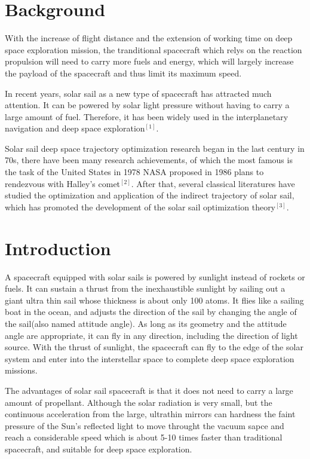 \documentclass[../Paper.tex]{subfiles}
\begin{document}
\section{Background}

With the increase of flight distance and the extension of working time on deep space exploration mission, the tranditional spacecraft which relys on the reaction propulsion will need to carry more fuels and energy, which will largely increase the payload of the spacecraft and thus limit its maximum speed.            

In recent years, solar sail as a new type of spacecraft has attracted much attention. It can be powered by solar light pressure without having to carry a large amount of fuel. Therefore, it has been widely used in the interplanetary navigation and deep space exploration$^{[1]}$. 

Solar sail deep space trajectory optimization research began in the last century in 70s, there have been many research achievements, of which the most famous is the task of the United States in 1978 NASA proposed in 1986 plans to rendezvous with Halley's comet$^{[2]}$. After that, several classical literatures have studied the optimization and application of the indirect trajectory of solar sail, which has promoted the development of the solar sail optimization theory$^{[3]}$. 

\section{Introduction}	

A spacecraft equipped with solar sails is powered by sunlight instead of rockets or fuels. It can sustain a thrust from the inexhaustible sunlight by sailing out a giant ultra thin sail whose thickness is about only 100 atoms. It flies like a sailing boat in the ocean, and adjusts the direction of the sail by changing the angle of the sail(also named attitude angle). As long as its geometry and the attitude angle are appropriate, it can fly in any direction, including the direction of light source. With the thrust of sunlight, the spacecraft can fly to the edge of the solar system and enter into the interstellar space to complete deep space exploration missions. 

The advantages of solar sail spacecraft is that it does not need to carry a large amount of propellant. Although the solar radiation is very small, but the continuous acceleration from the large, ultrathin mirrors can hardness the faint pressure of the Sun's reflected light to move throught the vacuum sapce and reach a considerable speed which is about 5-10 times faster than traditional spacecraft, and suitable for deep space exploration.            
\end{document}
